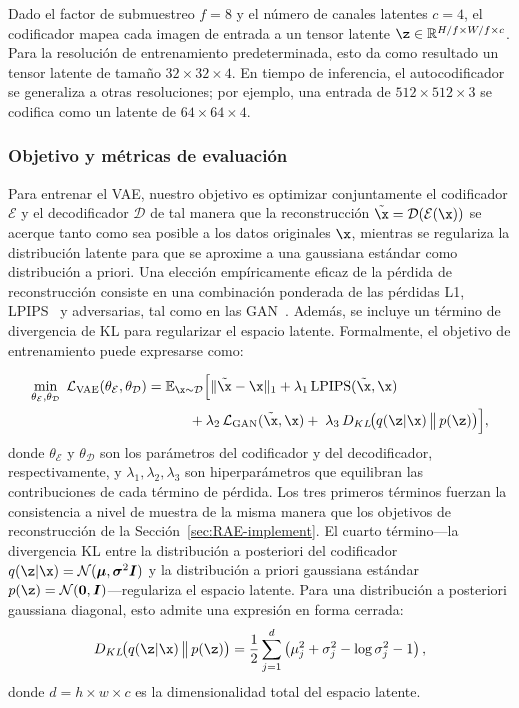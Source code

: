 \documentclass[../../book-main_es.tex]{subfiles}
\begin{document}
Dado el factor de submuestreo $f = 8$ y el número de canales latentes $c = 4$, el codificador mapea cada imagen 
de entrada a un tensor latente $\z \in \mathbb{R}^{H/f \times W/f \times c}$. Para la resolución de entrenamiento 
predeterminada, esto da como resultado un tensor latente de tamaño $32 \times 32 \times 4$. En tiempo de 
inferencia, el autocodificador se generaliza a otras resoluciones; por ejemplo, una entrada 
de $512 \times 512 \times 3$ se codifica como un latente de $64 \times 64 \times 4$.

\subsubsection{Objetivo y métricas de evaluación}
Para entrenar el VAE, nuestro objetivo es optimizar conjuntamente el codificador $\mathcal{E}$ y el 
decodificador $\mathcal{D}$ de tal manera que la reconstrucción 
$\tilde{\x} = \mathcal{D}(\mathcal{E}(\x))$ se acerque tanto como sea posible a los datos originales 
$\x$, mientras se regulariza la distribución latente para que se aproxime a una 
gaussiana estándar como distribución a priori. Una elección empíricamente eficaz de la pérdida de reconstrucción 
consiste en una combinación ponderada de las pérdidas L1, LPIPS~\citep{zhang2018unreasonable} y 
adversarias, tal como en las GAN~\citep{goodfellow2014generatve}. Además, 
se incluye un término de divergencia de KL para regularizar el espacio latente. Formalmente, el 
objetivo de entrenamiento puede expresarse como:

\begin{align}
\label{eq:vae_loss}
\min_{\theta_{\mathcal{E}}, \theta_{\mathcal{D}}} \; \mathcal{L}_{\mathrm{VAE}}(\theta_{\mathcal{E}}, \theta_{\mathcal{D}}) 
&= \mathbb{E}_{\x \sim \mathcal{D}} \Big[
    \|\tilde{\x} - \x\|_1 + \lambda_1 \, \mathrm{LPIPS}(\tilde{\x}, \x) \\
    &\qquad\quad + \lambda_2 \, \mathcal{L}_{\mathrm{GAN}}(\tilde{\x}, \x) + \; \lambda_3 \, D_{KL}\!\big(q(\z | \x) \,\big\|\, p(\z)\big)
\Big],
\end{align}
donde $\theta_{\mathcal{E}}$ y $\theta_{\mathcal{D}}$ son los parámetros del codificador y del 
decodificador, respectivamente, y $\lambda_1, \lambda_2, \lambda_3$ son hiperparámetros que 
equilibran las contribuciones de cada término de pérdida. Los tres primeros términos fuerzan 
la consistencia a nivel de muestra de la misma manera que los objetivos de reconstrucción de la 
Sección~\ref{sec:RAE-implement}. El cuarto término---la divergencia KL entre la distribución a 
posteriori del codificador $q(\z | \x) = \mathcal{N}(\boldsymbol{\mu}, \boldsymbol{\sigma}^2 \boldsymbol{I})$ 
y la distribución a priori gaussiana estándar $p(\z) = \mathcal{N}(\boldsymbol{0}, \boldsymbol{I})$---regulariza 
el espacio latente. Para una distribución a posteriori gaussiana diagonal, esto admite una expresión en forma cerrada:
\begin{equation}
    D_{KL}\!\big(q(\z | \x) \,\big\|\, p(\z)\big) = \frac{1}{2} \sum_{j=1}^{d} \left( \mu_j^2 + \sigma_j^2 - \log \sigma_j^2 - 1 \right),
\end{equation}
donde $d = h \times w \times c$ es la dimensionalidad total del espacio latente.
\end{document}
